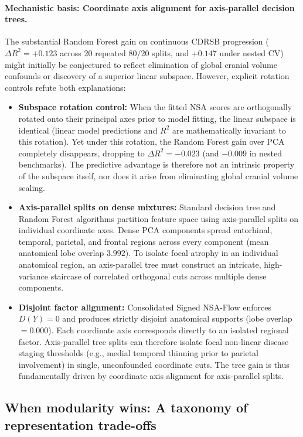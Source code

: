 \documentclass[11pt]{article}
\theoremstyle{definition}
\begin{document}
\paragraph{Mechanistic basis: Coordinate axis alignment for axis-parallel decision trees.}
The substantial Random Forest gain on continuous CDRSB progression ($\Delta R^2 = +0.123$ across 20 repeated 80/20 splits, and $+0.147$ under nested CV) might initially be conjectured to reflect elimination of global cranial volume confounds or discovery of a superior linear subspace. However, explicit rotation controls refute both explanations:
\begin{itemize}\itemsep2pt
  \item \textbf{Subspace rotation control:} When the fitted NSA scores are orthogonally rotated onto their principal axes prior to model fitting, the linear subspace is identical (linear model predictions and $R^2$ are mathematically invariant to this rotation). Yet under this rotation, the Random Forest gain over PCA completely disappears, dropping to $\Delta R^2 = -0.023$ (and $-0.009$ in nested benchmarks). The predictive advantage is therefore not an intrinsic property of the subspace itself, nor does it arise from eliminating global cranial volume scaling.
  \item \textbf{Axis-parallel splits on dense mixtures:} Standard decision tree and Random Forest algorithms partition feature space using axis-parallel splits on individual coordinate axes. Dense PCA components spread entorhinal, temporal, parietal, and frontal regions across every component (mean anatomical lobe overlap $3.992$). To isolate focal atrophy in an individual anatomical region, an axis-parallel tree must construct an intricate, high-variance staircase of correlated orthogonal cuts across multiple dense components.
  \item \textbf{Disjoint factor alignment:} Consolidated Signed NSA-Flow enforces $D(Y) = 0$ and produces strictly disjoint anatomical supports (lobe overlap $= 0.000$). Each coordinate axis corresponds directly to an isolated regional factor. Axis-parallel tree splits can therefore isolate focal non-linear disease staging thresholds (e.g., medial temporal thinning prior to parietal involvement) in single, unconfounded coordinate cuts. The tree gain is thus fundamentally driven by coordinate axis alignment for axis-parallel splits.
\end{itemize}

\subsection{When modularity wins: A taxonomy of representation trade-offs}\label{sec:exp-tradeoff}
\end{document}
